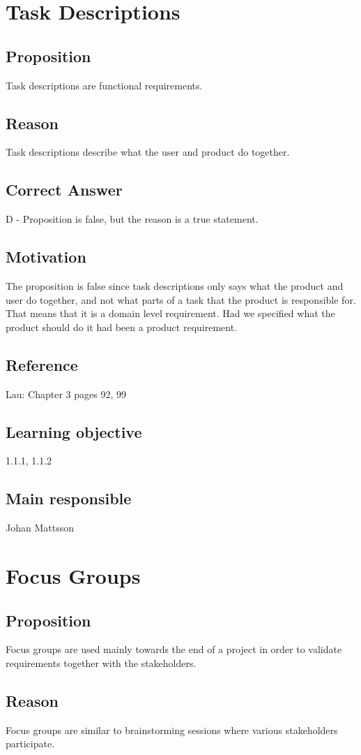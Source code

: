 \documentclass[a4paper]{article}
\begin{document}
\section{Task Descriptions}
\subsection*{Proposition}
Task descriptions are functional requirements.
\subsection*{Reason}
Task descriptions describe what the user and product do together.
\subsection*{Correct Answer}
D - Proposition is false, but the reason is a true statement.
\subsection*{Motivation}
The proposition is false since task descriptions only says what the product and user do together, and not what parts of a task that the product is responsible for. That means that it is a domain level requirement. Had we specified what the product should do it had been a product requirement.
\subsection*{Reference}
Lau: Chapter 3 pages 92, 99
\subsection*{Learning objective}
1.1.1, 1.1.2
\subsection*{Main responsible}
Johan Mattsson


\section{Focus Groups}
\subsection*{Proposition}
Focus groups are used mainly towards the end of a project in order to validate requirements together with the stakeholders.
\subsection*{Reason}
Focus groups are similar to brainstorming sessions where various stakeholders participate.
\end{document}

